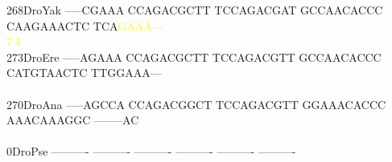 \documentclass[11pt,twoside,reqno,a4paper]{article}
\begin{document}
{268\hspace*{2\charwidth}DroYak	-----CGAAA	CCAGACGCTT	TCCAGACGAT	GCCAACACCC	CAAGAAACTC	TCA\textcolor{Yellow}{G}\textcolor{Yellow}{A}\textcolor{Yellow}{A}\textcolor{Yellow}{A}\textcolor{Yellow}{-}\textcolor{Yellow}{-}\textcolor{Yellow}{-}	\\
\hspace*{5\charwidth}\hspace*{7\charwidth}\hspace*{1\charwidth}\hspace*{1\charwidth}\hspace*{1\charwidth}\hspace*{1\charwidth}\hspace*{1\charwidth}\hspace*{53\charwidth}\textcolor{Yellow}{7.1}\hspace*{1\charwidth}\\
273\hspace*{2\charwidth}DroEre	-----AGAAA	CCAGACGCTT	TCCAGACGTT	GCCAACACCC	CATGTAACTC	TTGGAAA---	\\
\hspace*{5\charwidth}\hspace*{7\charwidth}\hspace*{1\charwidth}\hspace*{1\charwidth}\hspace*{1\charwidth}\hspace*{1\charwidth}\hspace*{1\charwidth}\hspace*{1\charwidth}\\
270\hspace*{2\charwidth}DroAna	-----AGCCA	CCAGACGGCT	TCCAGACGTT	GGAAACACCC	AAACAAAGGC	--------AC	\\
\hspace*{5\charwidth}\hspace*{7\charwidth}\hspace*{1\charwidth}\hspace*{1\charwidth}\hspace*{1\charwidth}\hspace*{1\charwidth}\hspace*{1\charwidth}\hspace*{1\charwidth}\\
0\hspace*{4\charwidth}DroPse	----------	----------	----------	----------	----------	----------	\\
\hspace*{5\charwidth}\hspace*{7\charwidth}\hspace*{1\charwidth}\hspace*{1\charwidth}\hspace*{1\charwidth}\hspace*{1\charwidth}\hspace*{1\charwidth}\hspace*{1\charwidth}\\
}
\end{document}
